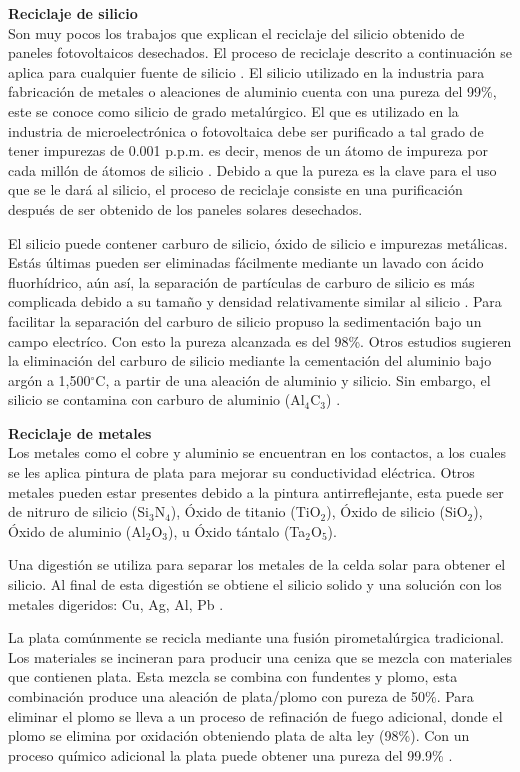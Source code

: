 \textbf{Reciclaje de silicio}\\ 
Son muy pocos los trabajos que explican el reciclaje del silicio obtenido de paneles fotovoltaicos desechados. El proceso de reciclaje descrito a continuación se aplica para cualquier fuente de silicio \citep{Louis2018}. 
El silicio utilizado en la industria para fabricación de metales o aleaciones de aluminio cuenta con una pureza del 99\%, este se conoce como silicio de grado metalúrgico. El que es utilizado en la industria de microelectrónica o fotovoltaica debe ser purificado a tal grado de tener impurezas de 0.001 p.p.m. es decir, menos de un átomo de impureza por cada millón de átomos de silicio \citep{Martil2016}. Debido a que la pureza es la clave para el uso que se le dará al silicio, el proceso de reciclaje consiste en una purificación después de ser obtenido de los paneles solares desechados. 

El silicio puede contener carburo de silicio, óxido de silicio e impurezas metálicas. Estás últimas pueden ser eliminadas fácilmente mediante un lavado con ácido fluorhídrico, aún así, la separación de partículas de carburo de silicio es más complicada debido a su tamaño y densidad relativamente similar al silicio \citep{Martil2016,Louis2018}. Para facilitar la separación del carburo de silicio \citet{DeSousa2014} propuso la sedimentación bajo un campo electríco. Con esto la pureza alcanzada es del 98\%.       
Otros estudios sugieren la eliminación del carburo de silicio mediante la cementación del aluminio bajo argón a 1,500$^{\circ}$C, a partir de una aleación de aluminio y silicio. Sin embargo, el silicio se contamina con carburo de aluminio (Al$_{4}$C$_{3}$) \citep{Louis2018}.

\textbf{Reciclaje de metales}\\
Los metales como el cobre y aluminio se encuentran en los contactos, a los cuales se les aplica pintura de plata para mejorar su conductividad eléctrica. Otros metales pueden estar presentes debido a la pintura antirreflejante, esta puede ser de nitruro de silicio (Si$_{3}$N$_{4}$), Óxido de titanio (TiO$_{2}$), Óxido de silicio (SiO$_{2}$), Óxido de aluminio (Al$_{2}$O$_{3}$), u Óxido tántalo (Ta$_{2}$O$_{5}$). 

Una digestión se utiliza para separar los metales de la celda solar para obtener el silicio. Al final de esta digestión se obtiene el silicio solido y una solución con los metales digeridos: Cu, Ag, Al, Pb \citep{Carlos2019,Klugman2010}. 

La plata comúnmente se recicla mediante una fusión pirometalúrgica tradicional. Los materiales se incineran para producir una ceniza que se mezcla con materiales que contienen plata. Esta mezcla se combina con fundentes y plomo, esta combinación produce una aleación de plata/plomo con pureza de 50\%. Para eliminar el plomo se lleva a un proceso de refinación de fuego adicional, donde el plomo se elimina por oxidación obteniendo plata de alta ley (98\%). Con un proceso químico adicional la plata puede obtener una pureza del 99.9\% \citep{Louis2018,Hillard2003}. 
 
